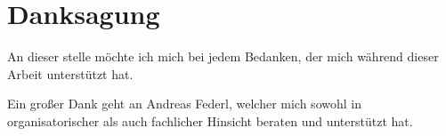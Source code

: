\section*{Danksagung}

An dieser stelle möchte ich mich bei jedem Bedanken, der mich während dieser Arbeit unterstützt hat. 

Ein großer Dank geht an Andreas Federl, welcher mich sowohl in organisatorischer als auch fachlicher Hinsicht beraten und unterstützt hat.